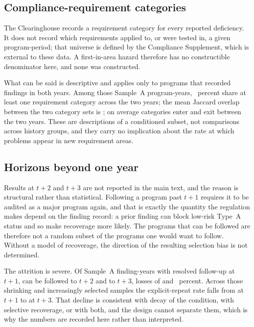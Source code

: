 \subsection{Compliance-requirement categories}

The Clearinghouse records a requirement category for every reported
deficiency. It does not record which requirements applied to, or were tested
in, a given program-period; that universe is defined by the Compliance
Supplement, which is external to these data. A first-in-area hazard therefore
has no constructible denominator here, and none was constructed.

What can be said is descriptive and applies only to programs that recorded
findings in both years. Among those \nOverlapN{} Sample~A program-years,
\nOverlapShares{}~percent share at least one requirement category across the
two years; the mean Jaccard overlap between the two category sets is
\nOverlapJaccard{}; on average \nOverlapEntering{} categories enter and
\nOverlapExiting{} exit between the two years. These are descriptions of a
conditioned subset, not comparisons across history groups, and they carry no
implication about the rate at which problems appear in new requirement areas.

\subsection{Horizons beyond one year}

Results at $t+2$ and $t+3$ are not reported in the main text, and the reason
is structural rather than statistical. Following a program past $t+1$ requires
it to be audited as a major program again, and that is exactly the quantity
the regulation makes depend on the finding record: a prior finding can block
low-risk Type~A status and so make recoverage more likely. The programs that
can be followed are therefore not a random subset of the programs one would
want to follow. Without a model of recoverage, the direction of the resulting
selection bias is not determined.

The attrition is severe. Of \nHorizonNone{} Sample~A finding-years with
resolved follow-up at $t+1$, \nHorizonNtwo{} can be followed to $t+2$ and
\nHorizonNthree{} to $t+3$, losses of \nHorizonLossTwo{} and
\nHorizonLossThree{}~percent. Across those shrinking and increasingly selected
samples the explicit-repeat rate falls from \nHorizonRepeatOne{} at $t+1$ to
\nHorizonRepeatThree{} at $t+3$. That decline is consistent with decay of the
condition, with selective recoverage, or with both, and the design cannot
separate them, which is why the numbers are recorded here rather than
interpreted.


